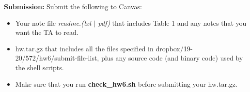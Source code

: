 \documentclass[11pt]{article}
\begin{document}
 

\vspace{0.5 in}

\noindent
{\bf Submission:}  Submit the following to Canvas:
\begin{itemize}
  \item Your note file {\it readme.(txt $\mid$ pdf)}
        that includes Table 1 and any notes that you want the TA to read.
      

  \item  hw.tar.gz that includes all the files specified in
      dropbox/19-20/572/hw6/submit-file-list, plus any source code
      (and binary code) used by the shell scripts.

  \item Make sure that you run {\bf check\_hw6.sh} before
    submitting your hw.tar.gz.


\end{itemize}
\end{document}
